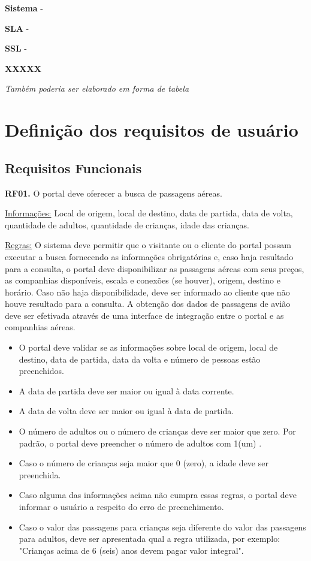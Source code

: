 \documentclass[12pt,twoside,a4paper]{article}
\begin{document}
\textbf{Sistema} -  

\textbf{SLA} - 
 
\textbf{SSL} - 
 
\textbf{XXXXX}

\textit{Também poderia ser elaborado em forma de tabela}

\section{Definição dos requisitos de usuário}
\subsection{Requisitos Funcionais}

\textbf{RF01.} O portal deve oferecer a busca de passagens aéreas.

\underline{Informações:} Local de origem, local de destino, data de partida, data de volta, quantidade  de adultos, quantidade de crianças, idade das crianças.

\underline{Regras:} O sistema deve permitir que o visitante ou o cliente do portal possam executar a busca fornecendo as informações obrigatórias e, caso haja resultado para a consulta, o portal deve disponibilizar as passagens aéreas com seus preços, as companhias disponíveis, escala e conexões (se houver), origem, destino e horário. Caso não haja disponibilidade, deve ser informado ao cliente que não houve resultado para a consulta. A obtenção dos dados de passagens de avião deve ser efetivada através de uma interface de integração entre o portal e as companhias aéreas.

\begin{itemize}

\item O portal deve validar se as informações sobre local de origem, local de destino, data de partida, data da volta e número de pessoas estão preenchidos.
\item A data de partida deve ser maior ou igual à data corrente.
\item A data de volta deve ser maior ou igual à data de partida.
\item O número de adultos ou o número de crianças deve ser maior que zero. Por padrão, o portal deve preencher o número de adultos com 1(um) .
\item Caso o número de crianças seja maior que 0 (zero), a idade deve ser preenchida.
\item Caso alguma das informações acima não cumpra essas regras, o portal deve informar o usuário a respeito do erro de preenchimento. 
\item Caso o valor das passagens para crianças seja diferente do valor das passagens para adultos, deve ser apresentada qual a regra utilizada, por exemplo: "Crianças acima de 6 (seis) anos devem pagar valor integral".

\end{itemize}
\end{document}
